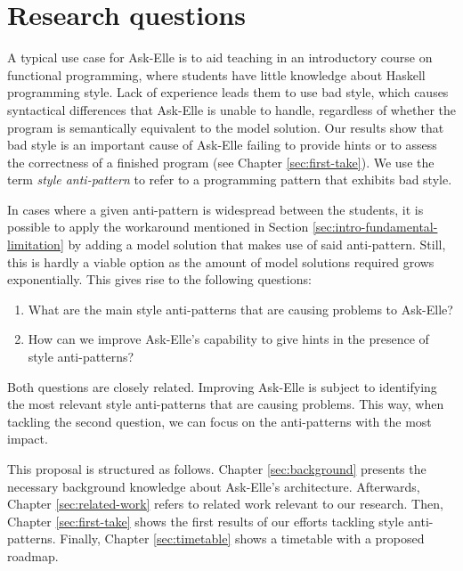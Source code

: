\section{Research questions}

A typical use case for Ask-Elle is to aid teaching in an introductory course on functional programming, where students have little knowledge about Haskell programming style. Lack of experience leads them to use bad style, which causes syntactical differences that Ask-Elle is unable to handle, regardless of whether the program is semantically equivalent to the model solution. Our results show that bad style is an important cause of Ask-Elle failing to provide hints or to assess the correctness of a finished program (see Chapter \ref{sec:first-take}). We use the term \emph{style anti-pattern} to refer to a programming pattern that exhibits bad style.

In cases where a given anti-pattern is widespread between the students, it is possible to apply the workaround mentioned in Section \ref{sec:intro-fundamental-limitation} by adding a model solution that makes use of said anti-pattern. Still, this is hardly a viable option as the amount of model solutions required grows exponentially. This gives rise to the following questions:

\begin{enumerate}
    \item What are the main style anti-patterns that are causing problems to Ask-Elle?
    \item How can we improve Ask-Elle's capability to give hints in the presence of style anti-patterns?
\end{enumerate}

Both questions are closely related. Improving Ask-Elle is subject to identifying the most relevant style anti-patterns that are causing problems. This way, when tackling the second question, we can focus on the anti-patterns with the most impact.

This proposal is structured as follows. Chapter \ref{sec:background} presents the necessary background knowledge about Ask-Elle's architecture. Afterwards, Chapter \ref{sec:related-work} refers to related work relevant to our research. Then, Chapter \ref{sec:first-take} shows the first results of our efforts tackling style anti-patterns. Finally, Chapter \ref{sec:timetable} shows a timetable with a proposed roadmap.

